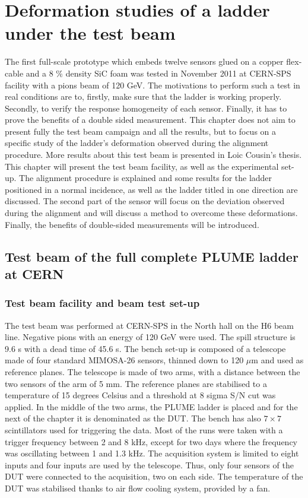 \chapter{Deformation studies of a ladder under the test beam}

  The first full-scale prototype which embeds twelve sensors glued on a copper flex-cable and a 8 \% density \gls{SiC} foam was tested in November 2011 at CERN-SPS facility with a pions beam of 120 GeV.
  The motivations to perform such a test in real conditions are to, firstly, make sure that the ladder is working properly.
  Secondly, to verify the response homogeneity of each sensor.
  Finally, it has to prove the benefits of a double sided measurement.
  This chapter does not aim to present fully the test beam campaign and all the results, but to focus on a specific study of the ladder's deformation observed during the alignment procedure.
  More results about this test beam is presented in Loic Cousin's thesis\cite{cousin}.
  This chapter will present the test beam facility, as well as the experimental set-up.
  The alignment procedure is explained and some results for the ladder positioned in a normal incidence, as well as the ladder titled in one direction are discussed.
  The second part of the sensor will focus on the deviation observed during the alignment and will discuss a method to overcome these deformations.
  Finally, the benefits of double-sided measurements will be introduced.
  
  \minitoc

  \section{Test beam of the full complete PLUME ladder at CERN}

    \subsection{Test beam facility and beam test set-up}

    The test beam was performed at CERN-SPS in the North hall on the H6 beam line.
    Negative pions with an energy of 120 GeV were used.
    The spill structure is 9.6 s with a dead time of 45.6 s. 
    The bench set-up is composed of a telescope made of four standard MIMOSA-26 sensors, thinned down to 120 $\mu\text{m}$ and used as reference planes.
    The telescope is made of two arms, with a distance between the two sensors of the arm of 5 mm.
    The reference planes are stabilised to a temperature of 15 degrees Celsius and a threshold at 8 sigma S/N cut was applied.
    In the middle of the two arms, the PLUME ladder is placed and for the next of the chapter it is denominated as the \gls{DUT}.
    The bench has also $7 \times 7$ scintillators used for triggering the data.
    Most of the runs were taken with a trigger frequency between 2 and 8 kHz, except for two days where the frequency was oscillating between 1 and 1.3 kHz.
    The acquisition system is limited to eight inputs and four inputs are used by the telescope.
    Thus, only four sensors of the \gls{DUT} were connected to the acquisition, two on each side.
    The temperature of the \gls{DUT} was stabilised thanks to air flow cooling system, provided by a fan.

